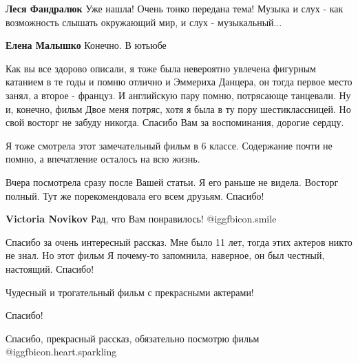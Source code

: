 \begin{itemize}
\begin{itemize}
\textbf{Леся Фандралюк} Уже нашла!
Очень тонко передана тема!
Музыка и слух - как возможность слышать окружающий мир, и слух - музыкальный...

\textbf{Елена Малышко} Конечно. В ютьюбе

\end{itemize} %


Как вы все здорово описали, я тоже была невероятно увлечена фигурным катанием в
те годы и помню отлично и Эммериха Данцера, он тогда первое место занял, а
второе - француз. И английскую пару помню, потрясающе танцевали. Ну и, конечно,
фильм Двое меня потряс, хотя я была в ту пору шестиклассницей. Но свой восторг
не забуду никогда. Спасибо Вам за воспоминания, дорогие сердцу.


Я тоже смотрела этот замечательный фильм в 6 классе. Содержание почти не помню,
а впечатление осталось на всю жизнь.


Вчера посмотрела сразу после Вашей статьи. Я его раньше не видела. Восторг
полный. Тут же порекомендовала его всем друзьям. Спасибо!

\textbf{Victoria Novikov} Рад, что Вам понравилось! @igg{fbicon.smile} 


Спасибо за очень интересный рассказ. Мне было 11 лет, тогда этих актеров никто не
знал. Но этот фильм Я почему-то запомнила, наверное, он был честный, настоящий.
Спасибо!

Чудесный и трогательный фильм с прекрасными актерами!

Спасибо!


Спасибо, прекрасный рассказ, обязательно посмотрю фильм
@igg{fbicon.heart.sparkling} 

\end{itemize} %
